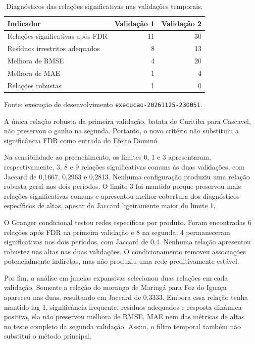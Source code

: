 \documentclass[12pt,a4paper]{article}
\begin{document}
\begin{table}[htbp]
    \centering
    \caption{Diagnósticos das relações significativas nas validações temporais.}
    \label{tab:granger-robustez}
    \small
    \begin{tabular}{lrr}
        \toprule
        \textbf{Indicador} & \textbf{Validação 1} & \textbf{Validação 2} \\
        \midrule
        Relações significativas após FDR & 11 & 30 \\
        Resíduos irrestritos adequados & 8 & 13 \\
        Melhora de RMSE & 4 & 20 \\
        Melhora de MAE & 1 & 4 \\
        Relações robustas & 1 & 0 \\
        \bottomrule
    \end{tabular}

    \par\smallskip
    \footnotesize
    Fonte: execução de desenvolvimento
    \texttt{execucao-20261125-230051}.
\end{table}

A única relação robusta da primeira validação, batata de Curitiba para
Cascavel, não preservou o ganho na segunda. Portanto, o novo critério não
substituiu a significância FDR como entrada do Efeito Dominó.

Na sensibilidade ao preenchimento, os limites 0, 1 e 3 apresentaram,
respectivamente, 3, 8 e 9 relações significativas comuns às duas validações,
com Jaccard de 0,1667, 0,2963 e 0,2813. Nenhuma configuração produziu uma
relação robusta geral nos dois períodos. O limite 3 foi mantido porque preservou
mais relações significativas comuns e apresentou melhor cobertura dos
diagnósticos específicos de altas, apesar do Jaccard ligeiramente maior do
limite 1.

O Granger condicional testou redes específicas por produto. Foram encontradas
6 relações após FDR na primeira validação e 8 na segunda; 4 permaneceram
significativas nos dois períodos, com Jaccard de 0,4. Nenhuma relação apresentou
robustez nas altas nas duas validações. O condicionamento removeu associações
potencialmente indiretas, mas não produziu uma rede preditivamente estável.

Por fim, a análise em janelas expansivas selecionou duas relações em cada
validação. Somente a relação do morango de Maringá para Foz do Iguaçu apareceu
nas duas, resultando em Jaccard de 0,3333. Embora essa relação tenha mantido lag
1, significância frequente, resíduos adequados e resposta dinâmica positiva,
ela não preservou melhora de RMSE, MAE nem das métricas de altas no teste
completo da segunda validação. Assim, o filtro temporal também não substitui o
método principal.
\end{document}
